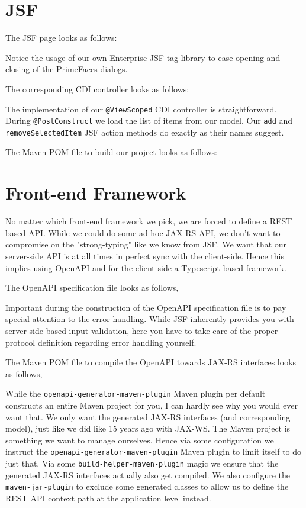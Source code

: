 \section{JSF}
The JSF page looks as follows:

Notice the usage of our own Enterprise JSF tag library to ease opening and closing of the PrimeFaces dialogs.

The corresponding CDI controller looks as follows:

The implementation of our \texttt{@ViewScoped} CDI controller is straightforward.
During \texttt{@PostConstruct} we load the list of items from our model.
Our \texttt{add} and \texttt{removeSelected\allowbreak Item} JSF action methods do exactly as their names suggest.

The Maven POM file to build our project looks as follows:


\section{Front-end Framework}
No matter which front-end framework we pick, we are forced to define a REST based API.
While we could do some ad-hoc JAX-RS API, we don't want to compromise on the "strong-typing" like we know from JSF.
We want that our server-side API is at all times in perfect sync with the client-side.
Hence this implies using OpenAPI \cite{openapi} and for the client-side a Typescript based framework.

The OpenAPI specification file looks as follows,

Important during the construction of the OpenAPI specification file is to pay special attention to the error handling.
While JSF inherently provides you with server-side based input validation, here you have to take care of the proper protocol definition regarding error handling yourself.

The Maven POM file to compile the OpenAPI towards JAX-RS interfaces looks as follows,

While the \texttt{openapi-generator-maven-plugin} Maven plugin per default constructs an entire Maven project for you, I can hardly see why you would ever want that.
We only want the generated JAX-RS interfaces (and corresponding model), just like we did like 15 years ago with JAX-WS.
The Maven project is something we want to manage ourselves.
Hence via some configuration we instruct the \texttt{openapi-generator-maven-plugin} Maven plugin to limit itself to do just that.
Via some \texttt{build-helper-\allowbreak maven-plugin} magic we ensure that the generated JAX-RS interfaces actually also get compiled.
We also configure the \texttt{maven-jar-plugin} to exclude some generated classes to allow us to define the REST API context path at the application level instead.

